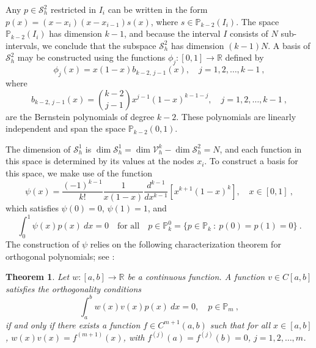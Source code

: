 \documentclass{amsart}
\newtheorem{theorem}{Theorem}[section]
\begin{document}
Any $p\in \mathcal{S}_h^2$ restricted in $I_i$ can be written in the form $p(x)=(x-x_i)(x-x_{i-1})s(x)$, where $s\in \mathbb{P}_{k-2}(I_i)$. The space $\mathbb{P}_{k-2}(I_i)$ has dimension $k-1$, and because the interval $I$ consists of $N$ sub-intervals, we conclude that the subspace $\mathcal{S}_h^2$ has dimension $(k-1)N$. 
%
A basis of $\mathcal{S}_h^2$ may be constructed using the functions $\phi_j:[0,1]\to \mathbb{R}$ defined by
$$\phi_j(x)=x(1-x)b_{k-2,\,j-1}(x),\quad j=1,2,\dots,k-1\ ,$$
where
$$b_{k-2,\,j-1}(x)=\binom{k-2}{j-1} x^{j-1}(1-x)^{k-1-j}, \quad j=1,2,\dots, k-1\ ,$$
are the Bernstein polynomials of degree $k-2$. These polynomials are linearly independent and span the space $\mathbb{P}_{k-2}(0,1)$.

The dimension of $\mathcal{S}_h^1$ is $\dim \mathcal{S}_h^1=\dim \mathcal{V}_h^k-\dim \mathcal{S}_h^2=N$, and each function in this space is determined by its values at the nodes $x_i$. To construct a basis for this space, we make use of the function
$$\psi(x)=\frac{(-1)^{k-1}}{k!} \frac{1}{x(1-x)}\frac{d^{k-1}}{dx^{k-1}}\left[x^{k+1}(1-x)^k \right],\quad x\in[0,1]\ ,$$
which satisfies $\psi(0)=0$, $\psi(1)=1$, and
\begin{equation}\label{eq:i}
    \int_0^1\psi(x)p(x)~dx=0\quad \text{for all}\quad p\in \mathbb{P}_k^0=\{p\in \mathbb{P}_k~:~p(0)=p(1)=0\}\ .
\end{equation}
The construction of $\psi$ relies on the following characterization theorem for orthogonal polynomials; see \cite[Th. 12.5, p. 141]{P1981}:
%
\begin{theorem}\label{thm:powel}
Let $w:[a,b]\to \mathbb{R}$ be a continuous function. A function $v\in C[a,b]$ satisfies the orthogonality conditions
$$\int_a^bw(x)v(x)p(x)~dx=0,\quad p\in \mathbb{P}_m\ ,$$
if and only if there exists a function $f\in C^{m+1}(a,b)$ such that for all $x\in[a,b]$, 
$w(x)v(x)=f^{(m+1)}(x)$, 
with 
$f^{(j)}(a)=f^{(j)}(b)=0$, $j=1,2,\dots, m$.
\end{theorem}
\end{document}
